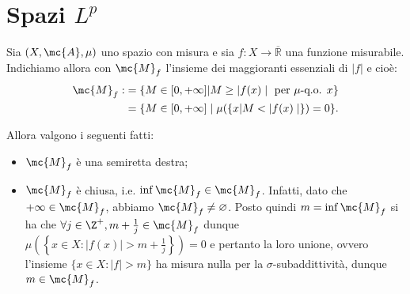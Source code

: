 \section{Spazi $L^{p}$}
\begin{oss}
    
    Sia $(X, \mc{A}, \mu)$ uno spazio con misura e sia $f: X \rightarrow \overline{\mathbb{R}}$ una funzione misurabile. Indichiamo allora con $\mc{M}_{f}$ l'insieme dei maggioranti essenziali di $|f|$ e cioè:
    \[
    \begin{aligned}
    \mc{M}_{f}: & =\{M \in[0,+\infty]|M \geq| f(x) \mid \text { per } \mu \text {-q.o. } x\} \\
    & =\{M \in[0,+\infty] \mid \mu(\{x|M<| f(x) \mid\})=0\} .
    \end{aligned}
    \]
    
    Allora valgono i seguenti fatti:
    
    \begin{itemize}
      \item $\mc{M}_{f}$ è una semiretta destra;
      \item $\mc{M}_{f}$ è chiusa, i.e. $\inf \mc{M}_{f} \in \mc{M}_{f}$. Infatti, dato che $+\infty \in \mc{M}_f$, abbiamo $\mc{M}_f \neq \varnothing$. Posto quindi $m = \inf \mc{M}_f$ si ha che $\forall j \in \Z^+, m + \frac{1}{j} \in \mc{M}_f$ dunque $\mu\left(\left\{x \in X : |f(x)|>m + \frac{1}{j}\right\}\right) = 0$ e pertanto la loro unione, ovvero l'insieme $\{x\in X : |f|>m\}$ ha misura nulla per la $\sigma$-subaddittività, dunque $m\in \mc{M}_f$.
    \end{itemize}
\end{oss}

